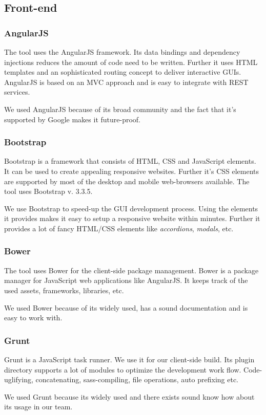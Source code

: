 \subsection{Front-end}

\subsubsection{AngularJS}
The tool uses the AngularJS framework. Its data bindings and dependency injections reduces the amount of code need to be written. Further it uses HTML templates and an sophisticated routing concept to deliver interactive GUIs. AngularJS is based on an MVC approach and is easy to integrate with REST services.\cite{angular}\par
We used AngularJS because of its broad community and the fact that it's supported by Google makes it future-proof.

\subsubsection{Bootstrap}
Bootstrap is a framework that consists of HTML, CSS and JavaScript elements. It can be used to create appealing responsive websites. Further it's CSS elements are supported by most of the desktop and mobile web-browsers available. The tool uses Bootstrap v. 3.3.5. \cite{bootstrap}\par
We use Bootstrap to speed-up the GUI development process. Using the elements it provides makes it easy to setup a responsive website within minutes. Further it provides a lot of fancy HTML/CSS elements like \textit{accordions}, \textit{modals}, etc.

\subsubsection{Bower}
The tool uses Bower for the client-side package management. Bower is a package manager for JavaScript web applications like AngularJS. It keeps track of the used assets, frameworks, libraries, etc. \cite{bower} \par
We used Bower because of its widely used, has a sound documentation and is easy to work with.

\subsubsection{Grunt}
Grunt is a JavaScript task runner. We use it for our client-side build. Its plugin directory supports a lot of modules to optimize the development work flow. Code-uglifying, concatenating, sass-compiling, file operations, auto prefixing etc. \cite{grunt} \par
We used Grunt because its widely used and there exists sound know how about its usage in our team.

